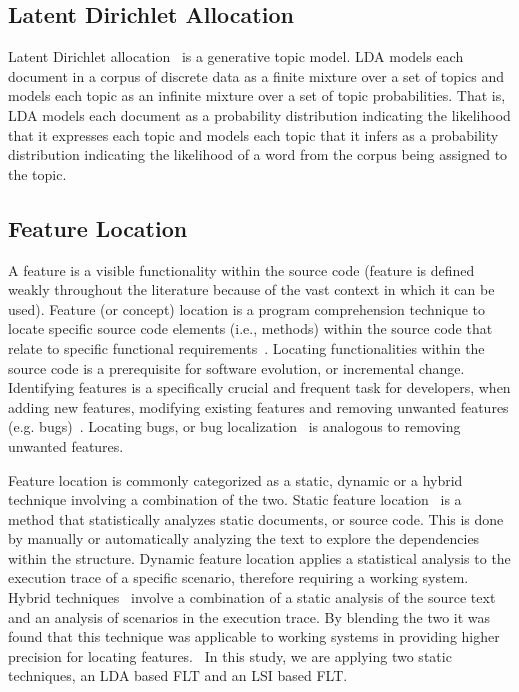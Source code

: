 \subsection{Latent Dirichlet Allocation}

Latent Dirichlet allocation~\cite{Blei-etal:2003} is a generative topic model.
LDA models each document in a corpus of discrete data as a finite mixture over
a set of topics and models each topic as an infinite mixture over a set of
topic probabilities.  That is, LDA models each document as a probability
distribution indicating the likelihood that it expresses each topic and models
each topic that it infers as a probability distribution indicating the
likelihood of a word from the corpus being assigned to the topic.


\subsection{Feature Location} 

A feature \cite{Biggerstaff} is a visible functionality within the source code
(feature is defined weakly throughout the literature because of the vast
context in which it can be used). Feature (or concept) location is a program
comprehension technique to locate specific source code elements (i.e., methods)
within the source code that relate to specific functional
requirements~\cite{972777, biggers2014configuring}. Locating functionalities
within the source code is a prerequisite for software evolution, or incremental
change.  Identifying features is a specifically crucial and frequent task for
developers, when adding new features, modifying existing features and removing
unwanted features (e.g.  bugs)~\cite{1309648, dit2013feature}. Locating bugs,
or bug localization~\cite{4656405, 6613841} is analogous to removing unwanted features.    

Feature location is commonly categorized as a static, dynamic or a hybrid
technique involving a combination of the two. Static feature
location~\cite{biggers2014configuring} is a method that statistically analyzes
static documents, or source code. This is done by manually or automatically
analyzing the text to explore the dependencies within the structure. Dynamic
feature location applies a statistical analysis to the execution trace of a
specific scenario, therefore requiring a working system.~\cite{972777,4181710}
Hybrid techniques~\cite{1183929} involve a combination of a static analysis of
the source text and an analysis of scenarios in the execution trace. By
blending the two it was found that this technique was applicable to working
systems in providing higher precision for locating features.~\cite{4181710,
ernst2004static, revelleimproving} In this study, we are applying two static
techniques, an LDA based FLT and an LSI based FLT. 

